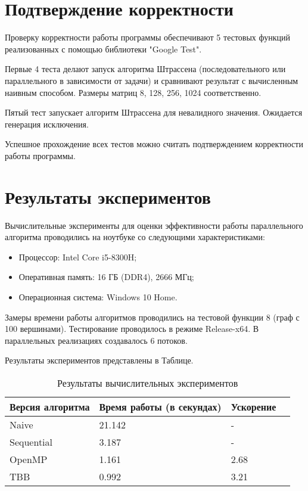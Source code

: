 \documentclass{report}
\begin{document}
\newpage

\section*{Подтверждение корректности}
\par Проверку корректности работы программы обеспечивают 5 тестовых функций реализованных с помощью библиотеки "Google Test".
\par Первые 4 теста делают запуск алгоритма Штрассена (последовательного или параллельного в зависимости от задачи) и сравнивают результат с вычисленным наивным способом. Размеры матриц 8, 128, 256, 1024 соответственно.
\par Пятый тест запускает алгоритм Штрассена для невалидного значения. Ожидается генерация исключения.
\par Успешное прохождение всех тестов можно считать подтверждением корректности работы программы.
\newpage

\section*{Результаты экспериментов}
Вычислительные эксперименты для оценки эффективности работы параллельного алгоритма проводились на ноутбуке со следующими характеристиками:
\begin{itemize}
\item Процессор: Intel Core i5-8300H;
\item Оперативная память: 16 ГБ (DDR4), 2666 МГц;
\item Операционная система: Windows 10 Home.
\end{itemize}
\par Замеры времени работы алгоритмов проводились на тестовой функции 8 (граф с 100 вершинами). Тестирование проводилось в режиме Release-x64. В параллельных реализациях создавалось 6 потоков.

\par Результаты экспериментов представлены в Таблице.
\begin{table}[!h]
\caption{Результаты вычислительных экспериментов}
\centering
\begin{tabular}{| p{2cm} | p{3cm} | p{4cm} | p{2cm} |}
\hline
Версия алгоритма & Время работы (в секундах) & Ускорение  \\[5pt]
\hline
Naive               & 21.142        & -     \\
Sequential        & 3.187        & -         \\
OpenMP        & 1.161        & 2.68         \\
TBB       & 0.992        & 3.21      \\

\hline
\end{tabular}
\end{table}
\end{document}
